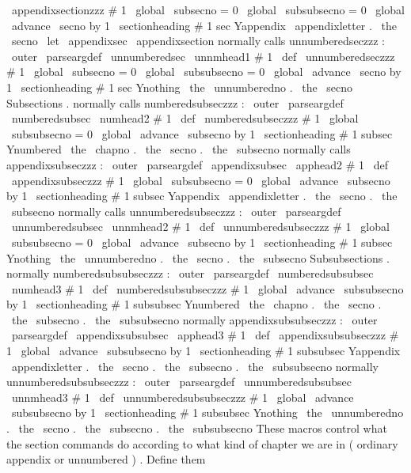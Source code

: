 {{{{\
appendixsectionzzz
#
1
{
%
\
global
\
subsecno
=
0
\
global
\
subsubsecno
=
0
\
global
\
advance
\
secno
by
1
\
sectionheading
{
#
1
}
{
sec
}
{
Yappendix
}
{
\
appendixletter
.
\
the
\
secno
}
%
}
\
let
\
appendixsec
\
appendixsection
%
normally
calls
unnumberedseczzz
:
\
outer
\
parseargdef
\
unnumberedsec
{
\
unnmhead1
{
#
1
}
}
\
def
\
unnumberedseczzz
#
1
{
%
\
global
\
subsecno
=
0
\
global
\
subsubsecno
=
0
\
global
\
advance
\
secno
by
1
\
sectionheading
{
#
1
}
{
sec
}
{
Ynothing
}
{
\
the
\
unnumberedno
.
\
the
\
secno
}
%
}
%
Subsections
.
%
%
normally
calls
numberedsubseczzz
:
\
outer
\
parseargdef
\
numberedsubsec
{
\
numhead2
{
#
1
}
}
\
def
\
numberedsubseczzz
#
1
{
%
\
global
\
subsubsecno
=
0
\
global
\
advance
\
subsecno
by
1
\
sectionheading
{
#
1
}
{
subsec
}
{
Ynumbered
}
{
\
the
\
chapno
.
\
the
\
secno
.
\
the
\
subsecno
}
%
}
%
normally
calls
appendixsubseczzz
:
\
outer
\
parseargdef
\
appendixsubsec
{
\
apphead2
{
#
1
}
}
\
def
\
appendixsubseczzz
#
1
{
%
\
global
\
subsubsecno
=
0
\
global
\
advance
\
subsecno
by
1
\
sectionheading
{
#
1
}
{
subsec
}
{
Yappendix
}
%
{
\
appendixletter
.
\
the
\
secno
.
\
the
\
subsecno
}
%
}
%
normally
calls
unnumberedsubseczzz
:
\
outer
\
parseargdef
\
unnumberedsubsec
{
\
unnmhead2
{
#
1
}
}
\
def
\
unnumberedsubseczzz
#
1
{
%
\
global
\
subsubsecno
=
0
\
global
\
advance
\
subsecno
by
1
\
sectionheading
{
#
1
}
{
subsec
}
{
Ynothing
}
%
{
\
the
\
unnumberedno
.
\
the
\
secno
.
\
the
\
subsecno
}
%
}
%
Subsubsections
.
%
%
normally
numberedsubsubseczzz
:
\
outer
\
parseargdef
\
numberedsubsubsec
{
\
numhead3
{
#
1
}
}
\
def
\
numberedsubsubseczzz
#
1
{
%
\
global
\
advance
\
subsubsecno
by
1
\
sectionheading
{
#
1
}
{
subsubsec
}
{
Ynumbered
}
%
{
\
the
\
chapno
.
\
the
\
secno
.
\
the
\
subsecno
.
\
the
\
subsubsecno
}
%
}
%
normally
appendixsubsubseczzz
:
\
outer
\
parseargdef
\
appendixsubsubsec
{
\
apphead3
{
#
1
}
}
\
def
\
appendixsubsubseczzz
#
1
{
%
\
global
\
advance
\
subsubsecno
by
1
\
sectionheading
{
#
1
}
{
subsubsec
}
{
Yappendix
}
%
{
\
appendixletter
.
\
the
\
secno
.
\
the
\
subsecno
.
\
the
\
subsubsecno
}
%
}
%
normally
unnumberedsubsubseczzz
:
\
outer
\
parseargdef
\
unnumberedsubsubsec
{
\
unnmhead3
{
#
1
}
}
\
def
\
unnumberedsubsubseczzz
#
1
{
%
\
global
\
advance
\
subsubsecno
by
1
\
sectionheading
{
#
1
}
{
subsubsec
}
{
Ynothing
}
%
{
\
the
\
unnumberedno
.
\
the
\
secno
.
\
the
\
subsecno
.
\
the
\
subsubsecno
}
%
}
%
These
macros
control
what
the
section
commands
do
according
%
to
what
kind
of
chapter
we
are
in
(
ordinary
appendix
or
unnumbered
)
.
%
Define
them
}}}}
